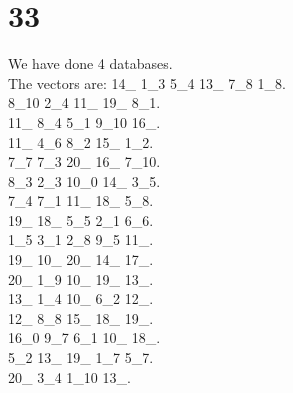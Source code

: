 \chapter{33}
\indent We have done 4 databases.\\
The vectors are:
14\_ 1\_3 5\_4 13\_ 7\_8 1\_8.\\8\_10 2\_4 11\_ 19\_ 8\_1.\\11\_ 8\_4 5\_1 9\_10 16\_.\\11\_ 4\_6 8\_2 15\_ 1\_2.\\7\_7 7\_3 20\_ 16\_ 7\_10.\\8\_3 2\_3 10\_0 14\_ 3\_5.\\7\_4 7\_1 11\_ 18\_ 5\_8.\\19\_ 18\_ 5\_5 2\_1 6\_6.\\1\_5 3\_1 2\_8 9\_5 11\_.\\19\_ 10\_ 20\_ 14\_ 17\_.\\20\_ 1\_9 10\_ 19\_ 13\_.\\13\_ 1\_4 10\_ 6\_2 12\_.\\12\_ 8\_8 15\_ 18\_ 19\_.\\16\_0 9\_7 6\_1 10\_ 18\_.\\5\_2 13\_ 19\_ 1\_7 5\_7.\\20\_ 3\_4 1\_10 13\_.\\